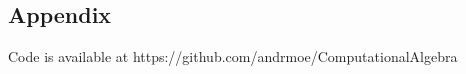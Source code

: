 \documentclass[12pt,a4paper]{article}
\begin{document}
\newpage
\begin{appendix}
\section*{Appendix}
    Code is available at https://github.com/andrmoe/ComputationalAlgebra
    
    
    
\end{appendix}
\end{document}
